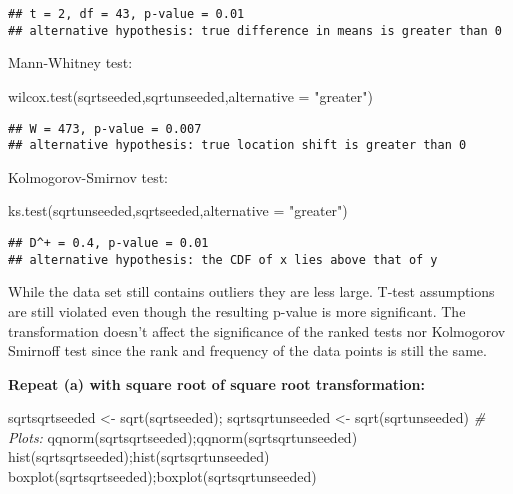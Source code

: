 \documentclass[
]{article}
\newenvironment{Shaded}{\begin{snugshade}}{\end{snugshade}}
\newcommand{\AttributeTok}[1]{\textcolor[rgb]{0.77,0.63,0.00}{#1}}
\newcommand{\CommentTok}[1]{\textcolor[rgb]{0.56,0.35,0.01}{\textit{#1}}}
\newcommand{\FunctionTok}[1]{\textcolor[rgb]{0.00,0.00,0.00}{#1}}
\newcommand{\NormalTok}[1]{#1}
\newcommand{\OtherTok}[1]{\textcolor[rgb]{0.56,0.35,0.01}{#1}}
\newcommand{\StringTok}[1]{\textcolor[rgb]{0.31,0.60,0.02}{#1}}
\begin{document}
\begin{verbatim}
## t = 2, df = 43, p-value = 0.01
## alternative hypothesis: true difference in means is greater than 0
\end{verbatim}

Mann-Whitney test:

\begin{Shaded}
\begin{Highlighting}[]
\FunctionTok{wilcox.test}\NormalTok{(sqrtseeded,sqrtunseeded,}\AttributeTok{alternative =} \StringTok{"greater"}\NormalTok{)}
\end{Highlighting}
\end{Shaded}

\begin{verbatim}
## W = 473, p-value = 0.007
## alternative hypothesis: true location shift is greater than 0
\end{verbatim}

Kolmogorov-Smirnov test:

\begin{Shaded}
\begin{Highlighting}[]
\FunctionTok{ks.test}\NormalTok{(sqrtunseeded,sqrtseeded,}\AttributeTok{alternative =} \StringTok{"greater"}\NormalTok{)}
\end{Highlighting}
\end{Shaded}

\begin{verbatim}
## D^+ = 0.4, p-value = 0.01
## alternative hypothesis: the CDF of x lies above that of y
\end{verbatim}

While the data set still contains outliers they are less large. T-test
assumptions are still violated even though the resulting p-value is more
significant. The transformation doesn't affect the significance of the
ranked tests nor Kolmogorov Smirnoff test since the rank and frequency
of the data points is still the same.

\textbf{Repeat (a) with square root of square root transformation:}

\begin{Shaded}
\begin{Highlighting}[]
\NormalTok{sqrtsqrtseeded }\OtherTok{\textless{}{-}} \FunctionTok{sqrt}\NormalTok{(sqrtseeded); sqrtsqrtunseeded }\OtherTok{\textless{}{-}} \FunctionTok{sqrt}\NormalTok{(sqrtunseeded)}
\CommentTok{\# Plots:}
\FunctionTok{qqnorm}\NormalTok{(sqrtsqrtseeded);}\FunctionTok{qqnorm}\NormalTok{(sqrtsqrtunseeded)}
\FunctionTok{hist}\NormalTok{(sqrtsqrtseeded);}\FunctionTok{hist}\NormalTok{(sqrtsqrtunseeded)}
\FunctionTok{boxplot}\NormalTok{(sqrtsqrtseeded);}\FunctionTok{boxplot}\NormalTok{(sqrtsqrtunseeded)}
\end{Highlighting}
\end{Shaded}
\end{document}
